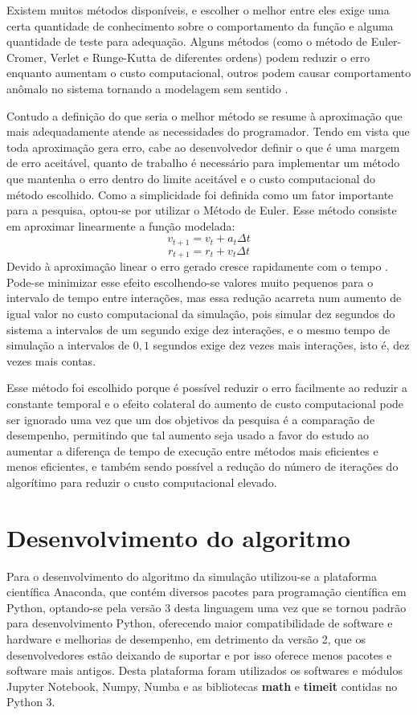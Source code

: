 \documentclass[
	12pt,				%
	a4paper,			%
	english,			%
	openright,				%
	brazil,				%
	oneside]{abntex2}
\begin{document}
	Existem muitos métodos disponíveis, e escolher o melhor entre eles exige uma certa quantidade de conhecimento sobre o comportamento da função e alguma quantidade de teste para adequação. Alguns métodos (como o método de Euler-Cromer, Verlet e Runge-Kutta de diferentes ordens) podem reduzir o erro enquanto aumentam o custo computacional, outros podem causar comportamento anômalo no sistema tornando a modelagem sem sentido \cite{giordano}.
	
	Contudo a definição do que seria o melhor método se resume à aproximação que mais adequadamente atende as necessidades do programador. Tendo em vista que toda aproximação gera erro, cabe ao desenvolvedor definir o que é uma margem de erro aceitável, quanto de trabalho é necessário para implementar um método que mantenha o erro dentro do limite aceitável e o custo computacional do método escolhido. Como a simplicidade foi definida como um fator importante para a pesquisa, optou-se por utilizar o Método de Euler. Esse método consiste em aproximar linearmente a função modelada:
	\[v_{t+1} = v_t + a_t\Delta t\]
	\[r_{t+1} = r_t + v_t\Delta t\]
	Devido à aproximação linear o erro gerado cresce rapidamente com o tempo \cite{giordano}. Pode-se minimizar esse efeito escolhendo-se valores muito pequenos para o intervalo de tempo entre interações, mas essa redução acarreta num aumento de igual valor no custo computacional da simulação, pois simular dez segundos do sistema a intervalos de um segundo exige dez interações, e o mesmo tempo de simulação a intervalos de $0,1$ segundos exige dez vezes mais interações, isto é, dez vezes mais contas.
	
	Esse método foi escolhido porque é possível reduzir o erro facilmente ao reduzir a constante temporal e o efeito colateral do aumento de custo computacional pode ser ignorado uma vez que um dos objetivos da pesquisa é a comparação de desempenho, permitindo que tal aumento seja usado a favor do estudo ao aumentar a diferença de tempo de execução entre métodos mais eficientes e menos eficientes, e também sendo possível a redução do número de iterações do algorítimo para reduzir o custo computacional elevado.
	
	
\section{Desenvolvimento do algoritmo}

	Para o desenvolvimento do algoritmo da simulação utilizou-se a plataforma científica Anaconda, que contém diversos pacotes para programação científica em Python, optando-se pela versão 3 desta linguagem uma vez que se tornou padrão para desenvolvimento Python, oferecendo maior compatibilidade de software e hardware e melhorias de desempenho, em detrimento da versão 2, que os desenvolvedores estão deixando de suportar e por isso oferece menos pacotes e software mais antigos. Desta plataforma foram utilizados os softwares e módulos Jupyter Notebook, Numpy, Numba e as bibliotecas \textbf{math} e \textbf{timeit} contidas no Python 3.
	
\end{document}
